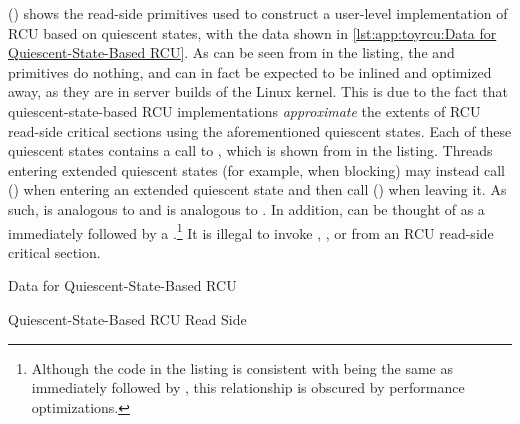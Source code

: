 \begin{fcvref}
()
shows the read-side primitives used to construct a user-level
implementation of RCU based on quiescent states, with the data shown in
\cref{lst:app:toyrcu:Data for Quiescent-State-Based RCU}.
As can be seen from  in the listing,
the 
and  primitives do nothing, and can in fact
be expected to be inlined and optimized away, as they are in
server builds of the Linux kernel.
This is due to the fact that quiescent-state-based RCU implementations
\emph{approximate} the extents of RCU read-side critical sections
using the aforementioned quiescent states.
Each of these quiescent states contains a call to
, which is shown from
 in the listing.
Threads entering extended quiescent states (for example, when blocking)
may instead call 
() when entering
an extended quiescent state and then call
() when leaving it.
As such,  is analogous to 
and  is analogous to .
In addition,  can be thought of as a
 immediately followed by a
.\footnote{
	Although the code in the listing is consistent with
	being the same as  immediately followed by
	, this relationship is obscured by
	performance optimizations.}
It is illegal to invoke , ,
or  from an RCU read-side critical section.
\end{fcvref}

\fi

\begin{listing}[tbp]

\caption{Data for Quiescent-State-Based RCU}
\label{lst:app:toyrcu:Data for Quiescent-State-Based RCU}
\end{listing}

\begin{listing}[tbp]

\caption{Quiescent-State-Based RCU Read Side}
\label{lst:app:toyrcu:Quiescent-State-Based RCU Read Side}
\end{listing}

